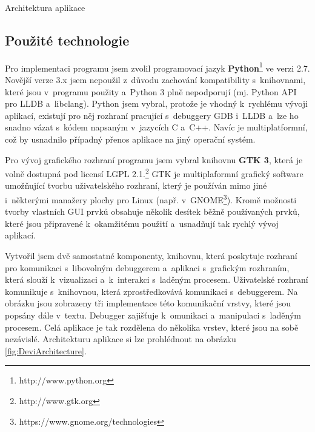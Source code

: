 \documentclass[czech,bachelor,male,python,dept460,hidelinks]{diploma}						%
\newcommand{\parspace}[1][]{
	\ifthenelse{\isempty{#1}}{\vspace{0mm}}{\vspace{#1}}
	\par
}
\begin{document}
\begin{section}{Architektura aplikace}
	\subsection{Použité technologie}
	\par Pro implementaci programu jsem zvolil programovací jazyk \textbf{Python}\footnote{http://www.python.org} ve verzi 2.7. Novější verze 3.x jsem nepoužil
	z~důvodu zachování kompatibility s~knihovnami, které jsou v~programu použity a~Python 3 plně nepodporují (mj. Python API pro LLDB a~libclang).
	Python jsem vybral, protože je vhodný k~rychlému vývoji aplikací, existují pro něj rozhraní pracující s~debuggery GDB i~LLDB a~lze ho snadno vázat
	s~kódem napsaným v~jazycích C a~C++. Navíc je multiplatformní, což by usnadnilo případný přenos aplikace na jiný operační systém.
	
	\parspace Pro vývoj grafického rozhraní programu jsem vybral knihovnu \textbf{GTK 3}, která je volně dostupná pod licensí LGPL 2.1.\footnote{http://www.gtk.org} 
	GTK je multiplaformní grafický software umožňující tvorbu uživatelského rozhraní, který je používán mimo jiné
	i~některými manažery plochy pro Linux (např. v~GNOME\footnote{https://www.gnome.org/technologies}). Kromě možnosti tvorby vlastních
	GUI prvků obsahuje několik desítek běžně používaných prvků, které jsou připravené k~okamžitému použití a~usnadňují tak rychlý vývoj aplikací.
	
	\parspace Vytvořil jsem dvě samostatné komponenty, knihovnu, která poskytuje rozhraní pro komunikaci s~libovolným debuggerem a~aplikaci s~grafickým rozhraním,
	která slouží k~vizualizaci a~k~interakci s~laděným procesem.
	Uživatelské rozhraní komunikuje s~knihovnou, která zprostředkovává komunikaci s~debuggerem. Na obrázku jsou zobrazeny tři implementace této komunikační vrstvy,
	které jsou popsány dále v~textu. Debugger zajišťuje k~omunikaci a~manipulaci s~laděným procesem. Celá aplikace je tak rozdělena do několika
	vrstev, které jsou na sobě nezávislé. Architekturu aplikace si lze prohlédnout na obrázku \ref{fig:DeviArchitecture}.
	
		

\end{section}
\end{document}
